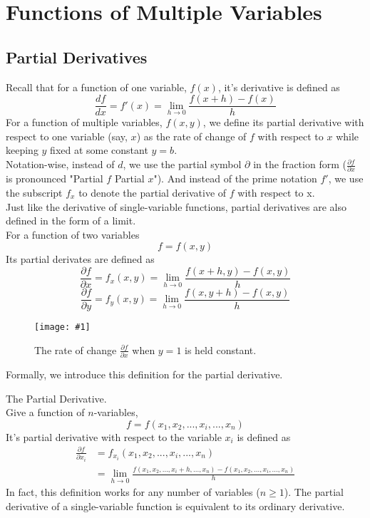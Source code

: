 \documentclass[11pt]{article}
\newcommand{\fig}[4]{
    \begin{figure}[H]
        \centering
        \texttt{[image: \#1]}
        \caption{#2}
        \label{exp4fit}
    \end{figure}
}
\theoremstyle{gangnamstyle}{\newtheorem{definition}{Definition}[]}
\theoremstyle{gangnamstyle}{\newtheorem{example}{Example}[]}
\theoremstyle{gangnamstyle}{\newtheorem{problem}{Problem}[]}
\begin{document}
\section{Functions of Multiple Variables}
\subsection{Partial Derivatives}

Recall that for a function of one variable, $f(x)$, it's derivative is defined as
\[ \frac{df}{dx} = f'(x) = \lim_{h \to 0} \frac{f(x + h) - f(x)}{h} \]
For a function of multiple variables, $f(x, y)$, we define its partial derivative with respect to one variable (say, $x$) as the rate of change of $f$ with respect to $x$ while keeping $y$ fixed at some constant $y = b$. \\
Notation-wise, instead of $d$, we use the partial symbol $\partial$ in the fraction form ($\frac{\partial f}{\partial x}$ is pronounced "Partial $f$ Partial $x$"). And instead of the prime notation $f'$, we use the subscript $f_x$ to denote the partial derivative of $f$ with respect to x. \\
Just like the derivative of single-variable functions, partial derivatives are also defined in the form of a limit. \\
For a function of two variables 
\[ f = f(x, y) \]
Its partial derivates are defined as 
\[ \frac{\partial f}{\partial x} = f_x(x, y) = \lim_{h \to 0} \frac{f(x + h, y) - f(x, y)}{h} \]
\[ \frac{\partial f}{\partial y} = f_y(x, y) = \lim_{h \to 0} \frac{f(x, y + h) - f(x, y)}{h} \]

\fig{figs/n0/partial.png}{The rate of change $\frac{\partial f}{\partial x}$ when $y = 1$ is held constant.}{0.7}{0}

\pagebreak

Formally, we introduce this definition for the partial derivative. 
\begin{definition}
The Partial Derivative. \\
Give a function of $n$-variables, 
\begin{equation}
f = f(x_1, x_2, ..., x_i, ..., x_n)
\end{equation}
It's partial derivative with respect to the variable $x_i$ is defined as 
\begin{equation}
\begin{aligned}
\frac{\partial f}{\partial x_i} &= f_{x_i}(x_1, x_2, ..., x_i, ..., x_n) \\ 
&= \lim_{h \to 0} \frac{f(x_1, x_2, ..., x_i + h, ..., x_n) - f(x_1, x_2, ..., x_i, ..., x_n)}{h}
\end{aligned}
\end{equation}
In fact, this definition works for any number of variables ($n \geq 1$). The partial derivative of a single-variable function is equivalent to its ordinary derivative. 
\end{definition}
\end{document}
